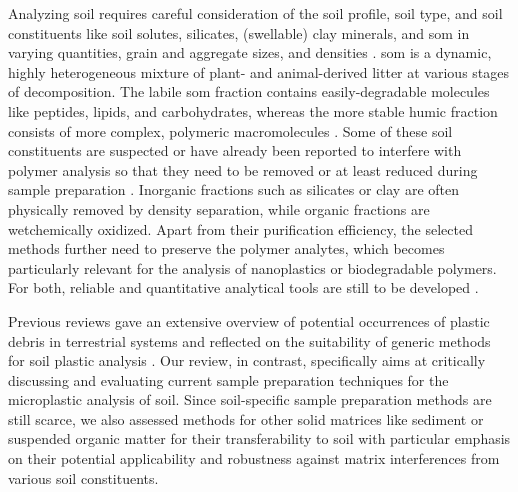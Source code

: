 Analyzing soil requires careful consideration of the soil profile, soil type, and soil constituents like soil solutes, silicates, (swellable) clay minerals, and \ac{som} in varying quantities, grain and aggregate sizes, and densities \citep{BlumeScheffer2016}.
\Ac{som} is a dynamic, highly heterogeneous mixture of plant- and animal-derived litter at various stages of decomposition. The labile \ac{som} fraction contains easily-degradable molecules like peptides, lipids, and carbohydrates, whereas the more stable humic fraction consists of more complex, polymeric macromolecules \citep{BronickSoil2005}.
Some of these soil constituents are suspected or have already been reported to interfere with polymer analysis so that they need to be removed or at least reduced during sample preparation \citep[Chapter~\ref{ch:py-gc-ms-method};][]{LoderEnzymatic2017,FischerSimultaneous2017}. Inorganic fractions such as silicates or clay are often physically removed by density separation, while organic fractions are wetchemically oxidized.
Apart from their purification efficiency, the selected methods further need to preserve the polymer analytes, which becomes particularly relevant for the analysis of nanoplastics or biodegradable polymers. For both, reliable and quantitative analytical tools are still to be developed \citep{WangPoor2018,WahlNanoplastic2021}.

Previous reviews gave an extensive overview of potential occurrences of plastic debris in terrestrial systems \citep{HurleyFate2018,ZhuOccurrence2019,Dioses-SalinasMethodological2020,WuMicroplastics2020,MeixnerMicroplastic2020} and reflected on the suitability of generic methods for soil plastic analysis \citep{BlasingPlastics2018,MollerFinding2020}.
Our review, in contrast, specifically aims at critically discussing and evaluating current sample preparation techniques for the microplastic analysis of soil. Since soil-specific sample preparation methods are still scarce, we also assessed methods for other solid matrices like sediment or suspended organic matter for their transferability to soil with particular emphasis on their potential applicability and robustness against matrix interferences from various soil constituents.

